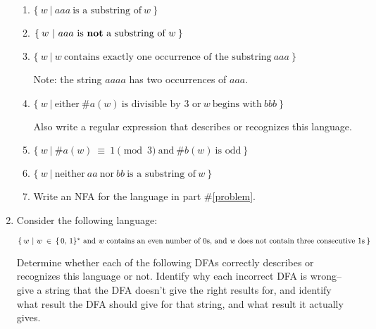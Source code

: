 \documentclass[11pt]{article}
\begin{document}
\begin{enumerate}
\begin{enumerate}
            \item $ \{ \: w\ | \ aaa \ \textrm{is a substring of} \ w\: \} $

            \item $ \{ \: w\ | \ aaa \ \mathrm{is} \ {\bf not}
                    \ \textrm{a substring of} \ w \: \} $

            \item $ \{ \: w \ | \ w \
                             \textrm{contains exactly one occurrence of the
                             substring}
                             \ aaa \: \} $

                  Note: the string $aaaa$ has two occurrences of $aaa$.

            \item \label{problem}

                  $ \{ \: w \ | \ \textrm{either} \ \#a(w)
                                  \ \textrm{is divisible by 3 or} \ w
                                  \ \textrm{begins with} \ bbb \: \} $

                  Also write a regular expression that describes or
                  recognizes this language.

            \item $ \{ \: w \ | \ \#a(w) \: \equiv \: 1 \pmod{3}
                             \ \mathrm{and} \ \#b(w) \ \textrm{is odd} \: \} $

            \item $ \{ \: w \ | \ \mathrm{neither} \ aa \ \mathrm{nor} \ bb \
                             \textrm{is a substring of} \ w \: \} $

            \item Write an NFA for the language in part \#\ref{problem}.

          \end{enumerate}

          \vspace{-6mm}

    \item Consider the following language:

          $ \{ \: w \ | \ w \: \in \: \{ \, 0, \, 1 \}^* \
                        \textrm{and \textit{w} contains an even number of
                                0s, and \textit{w} does not contain three
                                consecutive 1s} \: \} $

          Determine whether each of the following DFAs correctly describes
          or recognizes this language or not.  Identify why each incorrect
          DFA is wrong-- give a string that the DFA doesn't give the right
          results for, and identify what result the DFA should give for that
          string, and what result it actually gives.


\end{enumerate}
\end{document}
